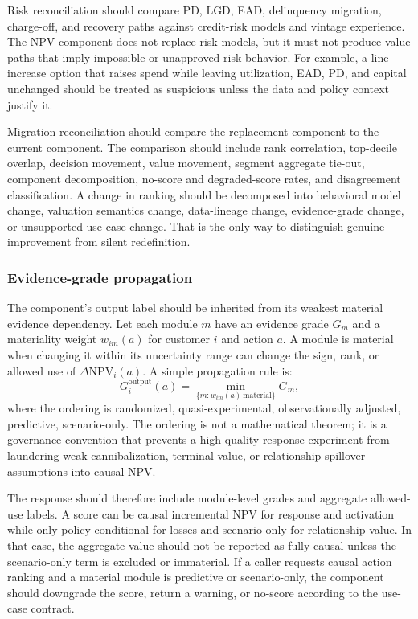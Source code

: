 \documentclass[11pt]{article}
\newcommand{\NPV}{\mathrm{NPV}}
\newcommand{\1}{\mathbf{1}}
\begin{document}
Risk reconciliation should compare PD, LGD, EAD, delinquency migration,
charge-off, and recovery paths against credit-risk models and vintage
experience. The NPV component does not replace risk models, but it must not
produce value paths that imply impossible or unapproved risk behavior. For
example, a line-increase option that raises spend while leaving utilization,
EAD, PD, and capital unchanged should be treated as suspicious unless the data
and policy context justify it.

Migration reconciliation should compare the replacement component to the
current component. The comparison should include rank correlation,
top-decile overlap, decision movement, value movement, segment aggregate
tie-out, component decomposition, no-score and degraded-score rates, and
disagreement classification. A change in ranking should be decomposed into
behavioral model change, valuation semantics change, data-lineage change,
evidence-grade change, or unsupported use-case change. That is the only way
to distinguish genuine improvement from silent redefinition.

\subsubsection{Evidence-grade propagation}
\label{subsec:evidence-grade-propagation}

The component's output label should be inherited from its weakest material
evidence dependency. Let each module $m$ have an evidence grade $G_m$ and a
materiality weight $w_{im}(a)$ for customer $i$ and action $a$. A module is
material when changing it within its uncertainty range can change the sign,
rank, or allowed use of $\Delta \NPV_i(a)$. A simple propagation rule is:
\begin{equation}
  G^{\mathrm{output}}_i(a)
  =
  \min_{\{m:w_{im}(a)\ \mathrm{material}\}} G_m,
  \label{eq:evidence-grade-propagation}
\end{equation}
where the ordering is randomized, quasi-experimental, observationally
adjusted, predictive, scenario-only. The ordering is not a mathematical
theorem; it is a governance convention that prevents a high-quality response
experiment from laundering weak cannibalization, terminal-value, or
relationship-spillover assumptions into causal NPV.

The response should therefore include module-level grades and aggregate
allowed-use labels. A score can be causal incremental NPV for response and
activation while only policy-conditional for losses and scenario-only for
relationship value. In that case, the aggregate value should not be reported
as fully causal unless the scenario-only term is excluded or immaterial. If a
caller requests causal action ranking and a material module is predictive or
scenario-only, the component should downgrade the score, return a warning, or
no-score according to the use-case contract.
\end{document}
